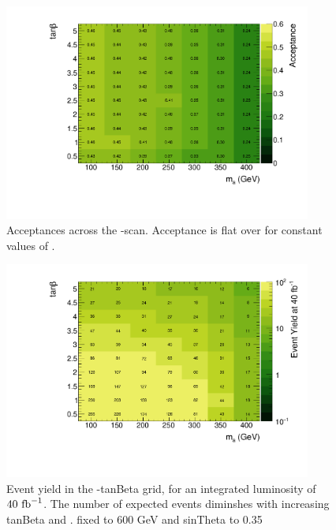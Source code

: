 \begin{figure}
\centering
\includegraphics[width=0.9\textwidth]{texinputs/04_grid/figures/monoz/leptonic/tanbma_ae_ll.pdf}
\caption{Acceptances across the \ma-\tanb scan.  Acceptance is flat over \tanb for constant values of \ma.}
\label{fig:monoz_ll_tanbma_acceptance}
\end{figure}

\begin{figure}
\centering
\includegraphics[width=0.9\textwidth]{texinputs/04_grid/figures/monoz/leptonic/tanbma_yield_ll.pdf}
\caption{Event yield in the \ma-tanBeta grid, for an integrated luminosity of $40~\rm{fb}^{-1}$.  The number of expected events diminshes with increasing tanBeta and \ma.  \mA fixed to 600 GeV and sinTheta to 0.35}
\end{figure}



